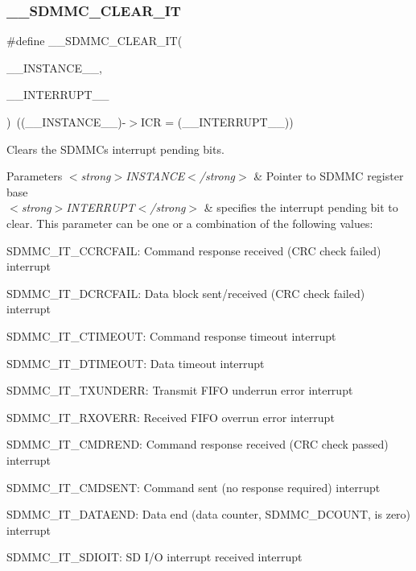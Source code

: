 \subsubsection{\texorpdfstring{\_\_SDMMC\_CLEAR\_IT}{\_\_SDMMC\_CLEAR\_IT}}
{\footnotesize\ttfamily \#define \+\_\+\+\_\+\+S\+D\+M\+M\+C\+\_\+\+C\+L\+E\+A\+R\+\_\+\+IT(\begin{DoxyParamCaption}\item[{}]{\+\_\+\+\_\+\+I\+N\+S\+T\+A\+N\+C\+E\+\_\+\+\_\+,  }\item[{}]{\+\_\+\+\_\+\+I\+N\+T\+E\+R\+R\+U\+P\+T\+\_\+\+\_\+ }\end{DoxyParamCaption})~((\+\_\+\+\_\+\+I\+N\+S\+T\+A\+N\+C\+E\+\_\+\+\_\+)-\/$>$I\+CR = (\+\_\+\+\_\+\+I\+N\+T\+E\+R\+R\+U\+P\+T\+\_\+\+\_\+))}



Clears the S\+D\+M\+MC\textquotesingle{}s interrupt pending bits. 


\begin{DoxyParams}{Parameters}
{\em $<$strong$>$\+I\+N\+S\+T\+A\+N\+C\+E$<$/strong$>$} & Pointer to S\+D\+M\+MC register base \\
\hline
{\em $<$strong$>$\+I\+N\+T\+E\+R\+R\+U\+P\+T$<$/strong$>$} & specifies the interrupt pending bit to clear. This parameter can be one or a combination of the following values\+: \begin{DoxyItemize}
\item S\+D\+M\+M\+C\+\_\+\+I\+T\+\_\+\+C\+C\+R\+C\+F\+A\+IL\+: Command response received (C\+RC check failed) interrupt \item S\+D\+M\+M\+C\+\_\+\+I\+T\+\_\+\+D\+C\+R\+C\+F\+A\+IL\+: Data block sent/received (C\+RC check failed) interrupt \item S\+D\+M\+M\+C\+\_\+\+I\+T\+\_\+\+C\+T\+I\+M\+E\+O\+UT\+: Command response timeout interrupt \item S\+D\+M\+M\+C\+\_\+\+I\+T\+\_\+\+D\+T\+I\+M\+E\+O\+UT\+: Data timeout interrupt \item S\+D\+M\+M\+C\+\_\+\+I\+T\+\_\+\+T\+X\+U\+N\+D\+E\+RR\+: Transmit F\+I\+FO underrun error interrupt \item S\+D\+M\+M\+C\+\_\+\+I\+T\+\_\+\+R\+X\+O\+V\+E\+RR\+: Received F\+I\+FO overrun error interrupt \item S\+D\+M\+M\+C\+\_\+\+I\+T\+\_\+\+C\+M\+D\+R\+E\+ND\+: Command response received (C\+RC check passed) interrupt \item S\+D\+M\+M\+C\+\_\+\+I\+T\+\_\+\+C\+M\+D\+S\+E\+NT\+: Command sent (no response required) interrupt \item S\+D\+M\+M\+C\+\_\+\+I\+T\+\_\+\+D\+A\+T\+A\+E\+ND\+: Data end (data counter, S\+D\+M\+M\+C\+\_\+\+D\+C\+O\+U\+NT, is zero) interrupt \item S\+D\+M\+M\+C\+\_\+\+I\+T\+\_\+\+S\+D\+I\+O\+IT\+: SD I/O interrupt received interrupt \end{DoxyItemize}
\\
\hline
\end{DoxyParams}

